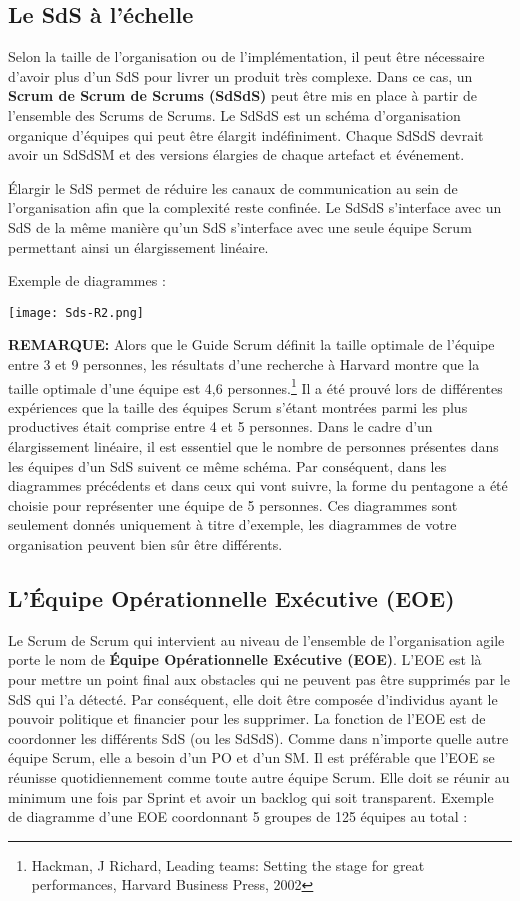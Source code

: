 \documentclass[12pt,a4paper,parskip=full]{scrartcl}
\begin{document}
\subsection{Le SdS à l'échelle}
Selon la taille de l'organisation ou de l'implémentation, il peut être nécessaire d'avoir plus
d'un SdS pour livrer un produit très complexe. Dans ce cas, un \textbf{Scrum de Scrum de
Scrums (SdSdS)} peut être mis en place à partir de l'ensemble des Scrums de Scrums. Le
SdSdS est un schéma d'organisation organique d'équipes qui peut être élargit
indéfiniment. Chaque SdSdS devrait avoir un SdSdSM et des versions élargies de chaque
artefact et événement.

Élargir le SdS permet de réduire les canaux de communication au sein de l'organisation
afin que la complexité reste confinée. Le SdSdS s'interface avec un SdS de la même
manière qu'un SdS s'interface avec une seule équipe Scrum permettant ainsi un
élargissement linéaire.

\pagebreak
Exemple de diagrammes :

\texttt{[image: Sds-R2.png]}

\textbf{\textsc{REMARQUE:}} Alors que le Guide Scrum définit la taille optimale de l'équipe entre 3 et 9
personnes, les résultats d'une recherche à Harvard montre que la taille optimale d'une
équipe est 4,6 personnes.\footnote{Hackman, J Richard, Leading teams: Setting the stage for
great performances, Harvard Business Press, 2002} Il a été prouvé lors de différentes expériences que la taille des
équipes Scrum s'étant montrées parmi les plus productives était comprise entre 4 et 5
personnes. Dans le cadre d'un élargissement linéaire, il est essentiel que le nombre de
personnes présentes dans les équipes d'un SdS suivent ce même schéma. Par
conséquent, dans les diagrammes précédents et dans ceux qui vont suivre, la forme du
pentagone a été choisie pour représenter une équipe de 5 personnes. Ces diagrammes
sont seulement donnés uniquement à titre d'exemple, les diagrammes de votre
organisation peuvent bien sûr être différents.

\subsection{L'Équipe Opérationnelle Exécutive (EOE)}
Le Scrum de Scrum qui intervient au niveau de l'ensemble de l'organisation agile porte le
nom de \textbf{Équipe Opérationnelle Exécutive (EOE)}. L'EOE est là pour mettre un point final
aux obstacles qui ne peuvent pas être supprimés par le SdS qui l'a détecté. Par
conséquent, elle doit être composée d'individus ayant le pouvoir politique et financier pour
les supprimer. La fonction de l'EOE est de coordonner les différents SdS (ou les SdSdS).
Comme dans n'importe quelle autre équipe Scrum, elle a besoin d'un PO et d'un SM. Il est
préférable que l'EOE se réunisse quotidiennement comme toute autre équipe Scrum. Elle
doit se réunir au minimum une fois par Sprint et avoir un backlog qui soit transparent.
Exemple de diagramme d'une EOE coordonnant 5 groupes de 125 équipes au total :
\end{document}
